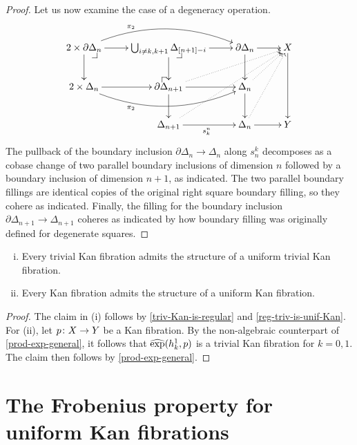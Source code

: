 \documentclass[reqno,10pt,a4paper,oneside]{amsart}
\begin{document}
\begin{proof}
Let us now examine the case of a degeneracy operation.
\[
\xymatrix{
  2 \times \partial \Delta_n
  \ar[r]
  \ar[d]
  \ar@/^2em/[rr]^(0.3){\pi_2}
  \pullback{dr}
&
  \bigcup_{i \neq k, k+1} \Delta_{[n+1] - i}
  \ar[r]
  \ar[d]
  \pullback{dr}
&
  \partial \Delta_n
  \ar[d]
  \ar[r]
&
  X
  \ar[dd]
\\
  2 \times \Delta_n
  \ar[r]
  \ar@/_2em/[rr]_(0.3){\pi_2}
&
  \partial \Delta_{n+1}
  \ar[r]
  \ar[d]
  \ar@{.>}[urr]
  \pullback{ul}
&
  \Delta_n
  \ar[d]
  \ar@{.>}[ur]
\\&
  \Delta_{n+1}
  \ar[r]_{s_k^n}
  \ar@{.>}[uurr]
&
  \Delta_n
  \ar[r]
  \ar@{.>}[uur]
&
  Y
}
\]
The pullback of the boundary inclusion $\partial \Delta_n \to \Delta_n$ along $s^k_n$ decomposes as a cobase change of two parallel boundary inclusions of dimension $n$ followed by a boundary inclusion of dimension $n+1$,
as indicated.
The two parallel boundary fillings are identical copies of the original right square boundary filling, so they cohere as indicated.
Finally, the filling for the boundary inclusion~$\partial \Delta_{n+1} \to \Delta_{n+1}$ coheres as indicated by how boundary filling was originally defined for degenerate squares.
\end{proof}











\begin{theorem}[ZFC]  \hfill 
\begin{enumerate}[(i)]
\item  Every trivial Kan fibration admits the structure of a uniform trivial Kan fibration.
\item Every Kan fibration admits the structure of a uniform  Kan fibration.
\end{enumerate} 
\end{theorem}

\begin{proof} The claim in (i) follows by \cref{triv-Kan-is-regular}  and \cref{reg-triv-is-unif-Kan}. For (ii), let
$p \colon X \to Y$ be a Kan fibration. By the non-algebraic counterpart of \cref{prod-exp-general}, it follows 
that $\operatorname{\widehat{exp}}(h_k^1, p)$ is a trivial Kan fibration for $k = 0, 1$. The claim then follows  by \cref{prod-exp-general}. 
\end{proof}




\section{The Frobenius property for uniform Kan fibrations} 
\label{sec:frobenius-uniform-fibration}
\end{document}

